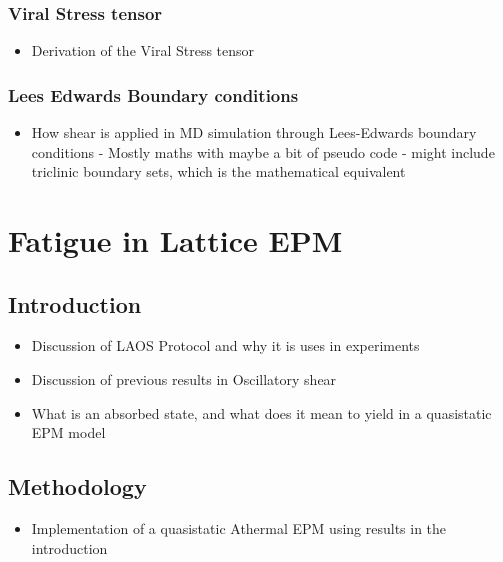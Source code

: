 \documentclass{library/duthesis}
\begin{document}
\subsection{Viral Stress tensor}
\begin{itemize}
    \item Derivation of the Viral Stress tensor
\end{itemize}
\subsection{Lees Edwards Boundary conditions}
\begin{itemize}
    \item How shear is applied in MD simulation through Lees-Edwards boundary conditions - Mostly maths with maybe a bit of pseudo code - might include triclinic boundary sets, which is the mathematical equivalent
\end{itemize}

\chapter{Fatigue in Lattice EPM}
\section{Introduction}
\begin{itemize}
    \item Discussion of LAOS Protocol and why it is uses in experiments
    \item Discussion of previous results in Oscillatory shear
    \item What is an absorbed state, and what does it mean to yield in a quasistatic EPM model
\end{itemize}

\section{Methodology}
\begin{itemize}
    \item Implementation of a quasistatic Athermal EPM using results in the introduction
\end{itemize}
\end{document}
